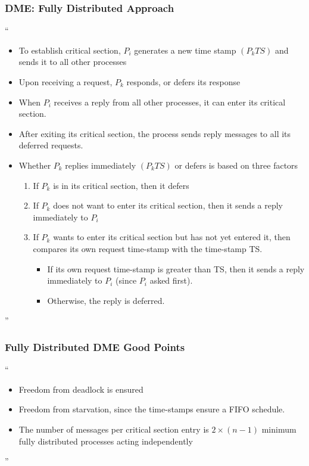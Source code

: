 \documentclass[11pt]{article}
\begin{document}
\subsubsection{DME: Fully Distributed Approach}
``\begin{itemize}
\item To establish critical section, $P_i$ generates a new time stamp $(P_k TS)$ and sends it to all other processes
\item Upon receiving a request, $P_k$ responds, or defers its response
\item When $P_i$ receives a reply from all other processes, it can enter its critical section.
\item After exiting its critical section, the process sends reply messages to all its deferred requests.
\item Whether $P_k$ replies immediately $(P_kTS)$ or defers is based on three factors
\begin{enumerate}
\item If $P_k$ is in its critical section, then it defers 
\item If $P_k$ does not want to enter its critical section, then it sends a reply immediately to $P_i$
\item If $P_k$ wants to enter its critical section but has not yet entered it, then compares its own request time-stamp with the time-stamp TS.
\begin{itemize}
\item If its own request time-stamp is greater than TS, then it sends a reply immediately to $P_i$ (since $P_i$ asked first).
\item Otherwise, the reply is deferred.
\end{itemize}

\end{enumerate}

\end{itemize}''
	

\subsubsection{Fully Distributed DME Good Points}
``\begin{itemize}
\item Freedom from deadlock is ensured
\item Freedom from starvation, since the time-stamps ensure a FIFO schedule.
\item The number of messages per critical section entry is $2 \times (n-1)$ minimum fully distributed processes acting independently
\end{itemize}''
	
\end{document}
